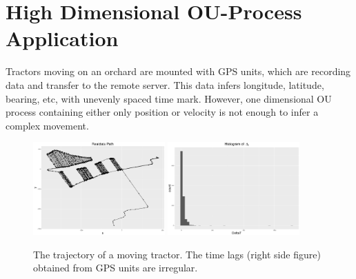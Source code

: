 \section{High Dimensional OU-Process Application}\label{SectionHighDimensionalOU}

Tractors moving on an orchard are mounted with GPS units, which are recording data and transfer to the remote server. This data infers longitude, latitude, bearing, etc, with unevenly spaced time mark. However, one dimensional OU process containing either only position or velocity is not enough to infer a complex movement. 

\begin{figure}[h]
\centering
\includegraphics[width=0.45\textwidth]{Chapters/05MCMCOU/plots/realdatapath.pdf}
\includegraphics[width=0.45\textwidth]{Chapters/05MCMCOU/plots/realdatahistdeltaT.pdf}
\caption{The trajectory of a moving tractor. The time lags (right side figure) obtained from GPS units are irregular.}
\label{realdatareview}
\end{figure}

